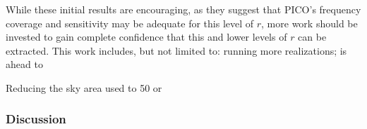 \documentclass[PICOReport.tex]{subfiles}
\begin{document}
While these initial results are encouraging, as they suggest that PICO's frequency coverage and sensitivity may be adequate for this level of $r$, more work should be invested to gain complete confidence that this and lower levels of $r$ can be extracted. This work includes, but not limited to: running more realizations; is ahead to 

Reducing the sky area used to 50 or




 \hspace{0.1in}


\subsubsection{Discussion}
\end{document}
